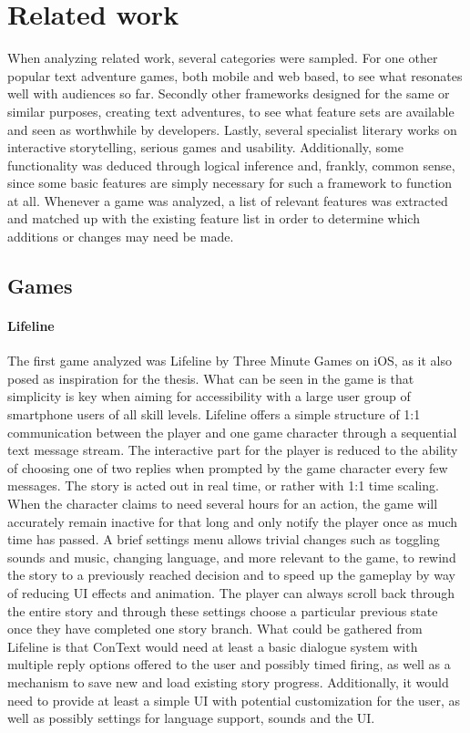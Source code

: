 \section{Related work}
When analyzing related work, several categories were sampled. For one other popular text adventure games, both mobile and web based, to see what resonates well with audiences so far. Secondly other frameworks designed for the same or similar purposes, creating text adventures, to see what feature sets are available and seen as worthwhile by developers. Lastly, several specialist literary works on interactive storytelling, serious games and usability. Additionally, some functionality was deduced through logical inference and, frankly, common sense, since some basic features are simply necessary for such a framework to function at all.
Whenever a game was analyzed, a list of relevant features was extracted and matched up with the existing feature list in order to determine which additions or changes may need be made.

\subsection{Games}
\paragraph{Lifeline} %
The first game analyzed was Lifeline by Three Minute Games on iOS, as it also posed as inspiration for the thesis. What can be seen in the game is that simplicity is key when aiming for accessibility with a large user group of smartphone users of all skill levels. Lifeline offers a simple structure of 1:1 communication between the player and one game character through a sequential text message stream. The interactive part for the player is reduced to the ability of choosing one of two replies when prompted by the game character every few messages. 
The story is acted out in real time, or rather with 1:1 time scaling. When the character claims to need several hours for an action, the game will accurately remain inactive for that long and only notify the player once as much time has passed.
A brief settings menu allows trivial changes such as toggling sounds and music, changing language, and more relevant to the game, to rewind the story to a previously reached decision and to speed up the gameplay by way of reducing UI effects and animation. 
The player can always scroll back through the entire story and through these settings choose a particular previous state once they have completed one story branch. 
What could be gathered from Lifeline is that ConText would need at least a basic dialogue system with multiple reply options offered to the user and possibly timed firing, as well as a mechanism to save new and load existing story progress. Additionally, it would need to provide at least a simple UI with potential customization for the user, as well as possibly settings for language support, sounds and the UI.
